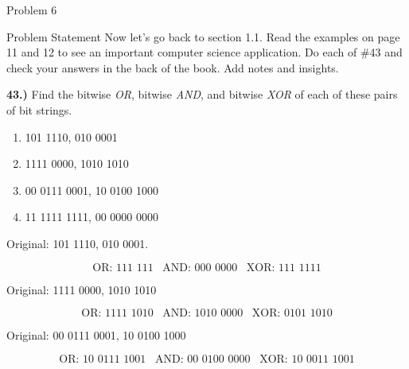 \begin{problem}{Problem 6}
    \begin{statement}{Problem Statement}
        Now let’s go back to section 1.1. Read the examples on page 11 and 12 to see an important computer science application. Do each of \#43 and check your answers in the back of the book. Add notes and 
        insights. \vspace*{1em}

        \noindent \textbf{43.)} Find the bitwise \textit{OR}, bitwise \textit{AND}, and bitwise \textit{XOR} of each of these pairs of bit strings.

        \begin{enumerate}[label=(\alph*)]
            \item 101 1110, 010 0001
            \item 1111 0000, 1010 1010
            \item 00 0111 0001, 10 0100 1000
            \item 11 1111 1111, 00 0000 0000
        \end{enumerate}
    \end{statement}

    \begin{highlight}
        Original: 101 1110, 010 0001.

        \setcounter{equation}{0}
        \begin{equation}
            \text{OR: 111 111} \hspace{10pt} \text{AND: 000 0000} \hspace{10pt} \text{XOR: 111 1111}
        \end{equation}
    \end{highlight}

    \begin{highlight}
        Original: 1111 0000, 1010 1010

        \begin{equation}
            \text{OR: 1111 1010} \hspace{10pt} \text{AND: 1010 0000} \hspace{10pt} \text{XOR: 0101 1010}
        \end{equation}
    \end{highlight}

    \begin{highlight}
        Original: 00 0111 0001, 10 0100 1000

        \begin{equation}
            \text{OR: 10 0111 1001} \hspace{10pt} \text{AND: 00 0100 0000} \hspace{10pt} \text{XOR: 10 0011 1001}
        \end{equation}
    \end{highlight}


\end{problem}
